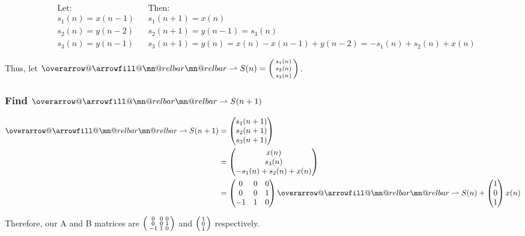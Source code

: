 \documentclass{article}
\makeatletter
\DeclareRobustCommand{\overrightharpoon}{\mathpalette{\overarrow@\rightharpoonfill@}}
\def\rightharpoonfill@{\arrowfill@\mn@relbar\mn@relbar\rightharpoonup}
\makeatother
\begin{document}
\begin{align*}
	&\text{Let:} && \text{Then:} \\
	&s_1(n) = x(n-1) && s_1(n+1) = x(n) \\
	&s_2(n) = y(n-2) && s_2(n+1) = y(n-1) = s_3(n) \\
	&s_3(n) = y(n-1) && s_3(n+1) = y(n) = x(n) - x(n-1) + y(n-2) = -s_1(n) + s_2(n) + x(n)
\end{align*}

Thus, let $\overrightharpoon{S(n)} = \begin{psmallmatrix} s_1(n) \\ s_2(n) \\ s_3(n) \end{psmallmatrix}$.

\subsubsection{Find $\overrightharpoon{S(n+1)}$}

\begin{align*}
	\overrightharpoon{S(n+1)} &= \begin{pmatrix} s_1(n+1) \\ s_2(n+1) \\ s_3(n+1)\end{pmatrix} \\
	&= \begin{pmatrix} x(n) \\ s_3(n) \\ -s_1(n) + s_2(n) + x(n) \end{pmatrix} \\
	&= \begin{pmatrix} 0 & 0 & 0 \\ 0 & 0 & 1 \\ -1 & 1 & 0 \end{pmatrix}\overrightharpoon{S(n)} + \begin{pmatrix} 1 \\ 0 \\ 1 \end{pmatrix}x(n)
\end{align*}

Therefore, our A and B matrices are $\begin{psmallmatrix} 0 & 0 & 0 \\ 0 & 0 & 1 \\ -1 & 1 & 0 \end{psmallmatrix}$ and $\begin{psmallmatrix} 1 \\ 0 \\ 1 \end{psmallmatrix}$ respectively.
\end{document}
